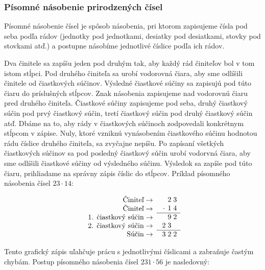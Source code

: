 \documentclass{article}
\begin{document}
\subsubsection{Písomné násobenie prirodzených čísel}

Písomné násobenie čísel je spôsob násobenia, pri ktorom zapisujeme čísla pod seba podľa rádov (jednotky pod jednotkami, desiatky pod desiatkami, stovky pod stovkami atď.) a postupne násobíme jednotlivé číslice podľa ich rádov.

Dva činitele sa zapíšu jeden pod druhým tak, aby každý rád činiteľov bol v tom istom stĺpci. Pod druhého činiteľa sa urobí vodorovná čiara, aby sme odlíšili činitele od čiastkových súčinov. Výsledné čiastkové súčiny sa zapisujú pod túto čiaru do príslušných stĺpcov. Znak násobenia zapisujeme nad vodorovnú čiaru pred druhého činiteľa. Čiastkové súčiny zapisujeme pod seba, druhý čiastkový súčin pod prvý čiastkový súčin, tretí čiastkový súčin pod druhý čiastkový súčin atď. Dbáme na to, aby rády v čiastkových súčinoch zodpovedali konkrétnym stĺpcom v zápise. Nuly, ktoré vzniknú vynásobením čiastkového súčinu hodnotou rádu číslice druhého činiteľa, sa zvyčajne nepíšu. Po zapísaní všetkých čiastkových súčinov sa pod posledný čiastkový súčin urobí vodorvná čiara, aby sme odlíšili čiastkové súčiny od výsledného súčinu. Výsledok sa zapíše pod túto čiaru, prihliadame na správny zápis číslic do stĺpcov. Príklad písomného násobenia čísel \(23 \cdot 14\):
\begin{table}[H]
  \centering
  \[
  \begin{array}{r}
    \text{Činiteľ} \rightarrow \\
    \text{Činiteľ} \rightarrow \\
    \text{1. čiastkový súčin} \rightarrow \\
    \text{2. čiastkový súčin} \rightarrow \\
    \text{Súčin} \rightarrow \\
  \end{array}
  \begin{array}{c@{\;}c@{\;}c@{\;}c}
    &   & 2 & 3 \\
    & \cdot  & 1 & 4 \\
    \hline
    &   & 9 & 2 \\
    & 2 & 3 &   \\
    \hline
    & 3 & 2 & 2
  \end{array}
  \]
\end{table}

Tento grafický zápis uľahčuje prácu s jednotlivými číslicami a zabraňuje častým chybám. Postup písomného násobenia čísel \(231 \cdot 56\) je nasledovný:
\end{document}
